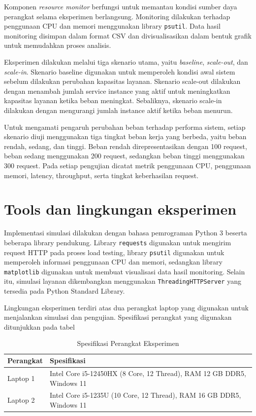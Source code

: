 \documentclass[conference]{IEEEtran}
\begin{document}
Komponen \textit{resource monitor} berfungsi untuk memantau kondisi sumber daya perangkat selama eksperimen berlangsung. Monitoring dilakukan terhadap penggunaan CPU dan memori menggunakan library \texttt{psutil}. Data hasil monitoring disimpan dalam format CSV dan divisualisasikan dalam bentuk grafik untuk memudahkan proses analisis.

Eksperimen dilakukan melalui tiga skenario utama, yaitu \textit{baseline}, \textit{scale-out}, dan \textit{scale-in}. Skenario baseline digunakan untuk memperoleh kondisi awal sistem sebelum dilakukan perubahan kapasitas layanan. Skenario scale-out dilakukan dengan menambah jumlah service instance yang aktif untuk meningkatkan kapasitas layanan ketika beban meningkat. Sebaliknya, skenario scale-in dilakukan dengan mengurangi jumlah instance aktif ketika beban menurun.

Untuk mengamati pengaruh perubahan beban terhadap performa sistem, setiap skenario diuji menggunakan tiga tingkat beban kerja yang berbeda, yaitu beban rendah, sedang, dan tinggi. Beban rendah direpresentasikan dengan 100 request, beban sedang menggunakan 200 request, sedangkan beban tinggi menggunakan 300 request. Pada setiap pengujian dicatat metrik penggunaan CPU, penggunaan memori, latency, throughput, serta tingkat keberhasilan request.

\section{Tools dan lingkungan eksperimen}
Implementasi simulasi dilakukan dengan bahasa pemrograman Python 3 beserta beberapa library pendukung. Library \texttt{requests} digunakan untuk mengirim request HTTP pada proses load testing, library \texttt{psutil} digunakan untuk memperoleh informasi penggunaan CPU dan memori, sedangkan library \texttt{matplotlib} digunakan untuk membuat visualisasi data hasil monitoring. Selain itu, simulasi layanan dikembangkan menggunakan \texttt{ThreadingHTTPServer} yang tersedia pada Python Standard Library.

Lingkungan eksperimen terdiri atas dua perangkat laptop yang digunakan untuk menjalankan simulasi dan pengujian. Spesifikasi perangkat yang digunakan ditunjukkan pada tabel 
\begin{table}[h]
\centering
\caption{Spesifikasi Perangkat Eksperimen}
\label{tab:laptop}

\begin{tabular}{|p{1.5cm}|p{5cm}|}
\hline
\textbf{Perangkat} & \textbf{Spesifikasi} \\
\hline
Laptop 1 &
Intel Core i5-12450HX (8 Core, 12 Thread), RAM 12 GB DDR5, Windows 11 \\
\hline
Laptop 2 &
Intel Core i5-1235U (10 Core, 12 Thread), RAM 16 GB DDR5, Windows 11 \\
\hline
\end{tabular}
\end{table}
\end{document}
